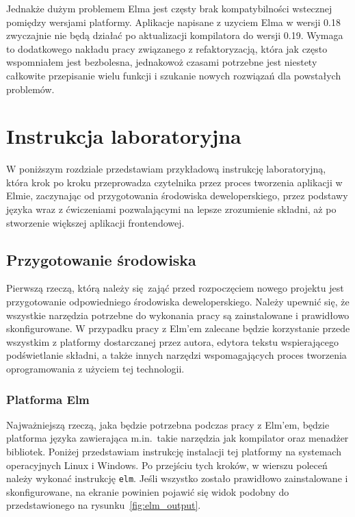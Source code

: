 \documentclass[twoside,a4paper]{report}
\begin{document}
Jednakże dużym problemem Elma jest częsty brak kompatybilności wstecznej pomiędzy wersjami platformy.
Aplikacje napisane z uzyciem Elma w wersji 0.18 zwyczajnie nie będą działać po aktualizacji kompilatora do wersji 0.19.
Wymaga to dodatkowego nakładu pracy związanego z refaktoryzacją, która jak często wspomniałem jest bezbolesna, jednakowoż czasami potrzebne jest niestety całkowite przepisanie wielu funkcji i szukanie nowych rozwiązań dla powstałych problemów.


\chapter{Instrukcja laboratoryjna}
W poniższym rozdziale przedstawiam przykładową instrukcję laboratoryjną, która krok po kroku przeprowadza czytelnika przez proces tworzenia aplikacji w Elmie, zaczynając od przygotowania środowiska deweloperskiego, przez podstawy języka wraz z ćwiczeniami pozwalającymi na lepsze zrozumienie składni, aż po stworzenie większej aplikacji frontendowej.

\section{Przygotowanie środowiska}
Pierwszą rzeczą, którą należy się zająć przed rozpoczęciem nowego projektu jest przygotowanie odpowiedniego środowiska deweloperskiego.
Należy upewnić się, że wszystkie narzędzia potrzebne do wykonania pracy są zainstalowane i prawidłowo skonfigurowane.
W przypadku pracy z Elm'em zalecane będzie korzystanie przede wszystkim z platformy dostarczanej przez autora, edytora tekstu wspierającego podświetlanie składni, a także innych narzędzi wspomagających proces tworzenia oprogramowania z użyciem tej technologii.

\subsection{Platforma Elm}
Najważniejszą rzeczą, jaka będzie potrzebna podczas pracy z Elm'em, będzie platforma języka zawierająca m.in.~takie narzędzia jak kompilator oraz menadżer bibliotek.
Poniżej przedstawiam instrukcję instalacji tej platformy na systemach operacyjnych Linux i Windows.
Po przejściu tych kroków, w wierszu poleceń należy wykonać instrukcję \texttt{elm}.
Jeśli wszystko zostało prawidłowo zainstalowane i skonfigurowane, na ekranie powinien pojawić się widok podobny do przedstawionego na rysunku~\ref{fig:elm_output}.
\end{document}
